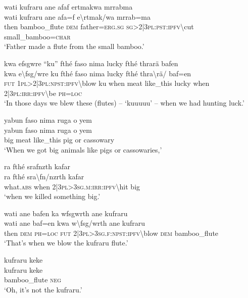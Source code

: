 \ea\label{ex:12:a790}
wati kufraru ane afaf ertmakwa mrrabma\\
\gll wati	kufraru	ane	afa=f	e{\textbackslash}rtmak/wa	mrrab=ma\\
     then	bamboo\_flute	\textsc{dem}	father=\textsc{erg}.\textsc{sg}	\textsc{sg}>2|3\textsc{pl}:\textsc{pst}:\textsc{ipfv}{\textbackslash}cut	small\_bamboo=\textsc{char}\\
\glt `Father made a flute from the small bamboo.'
\z

\ea\label{ex:12:a792}
kwa efsgwre ``ku'' fthé faso nima lucky fthé thrarä bafen\\
\gll kwa	e{\textbackslash}fsg/wre	ku	fthé	faso	nima	lucky	fthé	thra{\textbackslash}rä/	baf=en\\
     \textsc{fut}	1\textsc{pl}>2|3\textsc{pl}:\textsc{npst}:\textsc{ipfv}{\textbackslash}blow	ku	when	meat	like\_this	lucky	when	2|3\textsc{pl}:\textsc{irr}:\textsc{ipfv}{\textbackslash}be	\textsc{ph}=\textsc{loc}\\
\glt `In those days we blew these (flutes) -- ‘kuuuuu’ -- when we had hunting luck.'
\z

\ea\label{ex:12:a796}
yabun faso nima ruga o yem\\
\gll yabun	faso	nima	ruga	o	yem\\
     big	meat	like\_this	pig	or	cassowary\\
\glt `When we got big animals like pigs or cassowaries,'
\z

\ea\label{ex:12:a798}
ra fthé srafnzth kafar\\
\gll ra	fthé	sra{\textbackslash}fn/nzrth	kafar\\
     what.\textsc{abs}	when	2|3\textsc{pl}>3\textsc{sg}.\textsc{m}:\textsc{irr}:\textsc{ipfv}{\textbackslash}hit	big\\
\glt `when we killed something big.'
\z

\ea\label{ex:12:a799}
wati ane bafen ka wfsgwrth ane kufraru\\
\gll wati	ane	baf=en	kwa	w{\textbackslash}fsg/wrth	ane	kufraru\\
     then	\textsc{dem}	\textsc{ph}=\textsc{loc}	\textsc{fut}	2|3\textsc{pl}>3\textsc{sg}.\textsc{f}:\textsc{npst}:\textsc{ipfv}{\textbackslash}blow	\textsc{dem}	bamboo\_flute\\
\glt `That's when we blow the kufraru flute.'
\z

\ea\label{ex:12:a801}
kufraru keke\\
\gll kufraru	keke\\
     bamboo\_flute	\textsc{neg}\\
\glt `Oh, it's not the kufraru.'
\z

